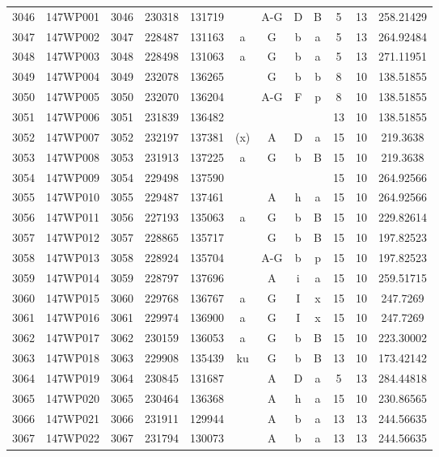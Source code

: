 \begin{tabular}{|*{12}{c|}}
3046 & 147WP001 & 3046 & 230318 & 131719 &  & A-G & D & B & 5 & 13 & 258.21429 \\ 
3047 & 147WP002 & 3047 & 228487 & 131163 & a & G & b & a & 5 & 13 & 264.92484 \\ 
3048 & 147WP003 & 3048 & 228498 & 131063 & a & G & b & a & 5 & 13 & 271.11951 \\ 
3049 & 147WP004 & 3049 & 232078 & 136265 &  & G & b & b & 8 & 10 & 138.51855 \\ 
3050 & 147WP005 & 3050 & 232070 & 136204 &  & A-G & F & p & 8 & 10 & 138.51855 \\ 
3051 & 147WP006 & 3051 & 231839 & 136482 &  &  &  &  & 13 & 10 & 138.51855 \\ 
3052 & 147WP007 & 3052 & 232197 & 137381 & (x) & A & D & a & 15 & 10 & 219.3638 \\ 
3053 & 147WP008 & 3053 & 231913 & 137225 & a & G & b & B & 15 & 10 & 219.3638 \\ 
3054 & 147WP009 & 3054 & 229498 & 137590 &  &  &  &  & 15 & 10 & 264.92566 \\ 
3055 & 147WP010 & 3055 & 229487 & 137461 &  & A & h & a & 15 & 10 & 264.92566 \\ 
3056 & 147WP011 & 3056 & 227193 & 135063 & a & G & b & B & 15 & 10 & 229.82614 \\ 
3057 & 147WP012 & 3057 & 228865 & 135717 &  & G & b & B & 15 & 10 & 197.82523 \\ 
3058 & 147WP013 & 3058 & 228924 & 135704 &  & A-G & b & p & 15 & 10 & 197.82523 \\ 
3059 & 147WP014 & 3059 & 228797 & 137696 &  & A & i & a & 15 & 10 & 259.51715 \\ 
3060 & 147WP015 & 3060 & 229768 & 136767 & a & G & I & x & 15 & 10 & 247.7269 \\ 
3061 & 147WP016 & 3061 & 229974 & 136900 & a & G & I & x & 15 & 10 & 247.7269 \\ 
3062 & 147WP017 & 3062 & 230159 & 136053 & a & G & b & B & 15 & 10 & 223.30002 \\ 
3063 & 147WP018 & 3063 & 229908 & 135439 & ku & G & b & B & 13 & 10 & 173.42142 \\ 
3064 & 147WP019 & 3064 & 230845 & 131687 &  & A & D & a & 5 & 13 & 284.44818 \\ 
3065 & 147WP020 & 3065 & 230464 & 136368 &  & A & h & a & 15 & 10 & 230.86565 \\ 
3066 & 147WP021 & 3066 & 231911 & 129944 &  & A & b & a & 13 & 13 & 244.56635 \\ 
3067 & 147WP022 & 3067 & 231794 & 130073 &  & A & b & a & 13 & 13 & 244.56635 \\ 

\end{tabular}
